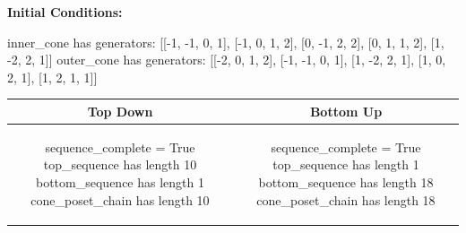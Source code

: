 \documentclass[10pt]{article}
\begin{document}
\textbf{Initial Conditions:}
\begin{SAGE}
inner_cone has generators: 
[[-1, -1, 0, 1], [-1, 0, 1, 2], [0, -1, 2, 2], [0, 1, 1, 2], [1, -2, 2, 1]]
outer_cone has generators: 
[[-2, 0, 1, 2], [-1, -1, 0, 1], [1, -2, 2, 1], [1, 0, 2, 1], [1, 2, 1, 1]]

\end{SAGE}
\begin{tabular}{c|c}
\textbf{Top Down} & \textbf{Bottom Up} \\ \hline  
\begin{SAGE}
sequence_complete = True
top_sequence has length 10
bottom_sequence has length 1
cone_poset_chain has length 10
\end{SAGE} 
&
\begin{SAGE}
sequence_complete = True
top_sequence has length 1
bottom_sequence has length 18
cone_poset_chain has length 18
\end{SAGE} 
\\ \hline


\end{tabular}
\end{document}
